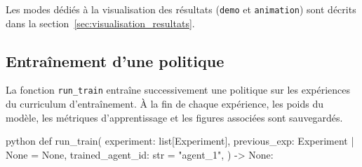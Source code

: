 \vspace{10pt}

\noindent Les modes dédiés à la visualisation des résultats (\texttt{demo} et \texttt{animation}) sont décrits dans la section~\ref{sec:visualisation_resultats}.

\subsection{Entraînement d'une politique}

\noindent La fonction \texttt{run\_train} entraîne successivement une politique sur les expériences du curriculum d'entraînement. À la fin de chaque expérience, les poids du modèle, les métriques d'apprentissage et les figures associées sont sauvegardés.

\begin{codebox}{python}
def run_train(
    experiment: list[Experiment],
    previous_exp: Experiment | None = None,
    trained_agent_id: str = "agent_1",
) -> None:
\end{codebox}

